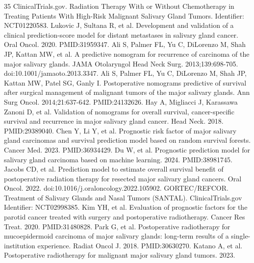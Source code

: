 \documentclass[10pt,twocolumn]{article}
\begin{document}
\begin{thebibliography}{35}
 ClinicalTrials.gov. Radiation Therapy With or Without Chemotherapy in Treating Patients With High-Risk Malignant Salivary Gland Tumors. Identifier: NCT01220583.
 Lukovic J, Sultana R, et al. Development and validation of a clinical prediction-score model for distant metastases in salivary gland cancer. Oral Oncol. 2020. PMID:31959347.
 Ali S, Palmer FL, Yu C, DiLorenzo M, Shah JP, Kattan MW, et al. A predictive nomogram for recurrence of carcinoma of the major salivary glands. JAMA Otolaryngol Head Neck Surg. 2013;139:698-705. doi:10.1001/jamaoto.2013.3347.
 Ali S, Palmer FL, Yu C, DiLorenzo M, Shah JP, Kattan MW, Patel SG, Ganly I. Postoperative nomograms predictive of survival after surgical management of malignant tumors of the major salivary glands. Ann Surg Oncol. 2014;21:637-642. PMID:24132626.
 Hay A, Migliacci J, Karassawa Zanoni D, et al. Validation of nomograms for overall survival, cancer-specific survival and recurrence in major salivary gland cancer. Head Neck. 2018. PMID:29389040.
 Chen Y, Li Y, et al. Prognostic risk factor of major salivary gland carcinomas and survival prediction model based on random survival forests. Cancer Med. 2023. PMID:36934429.
 Du W, et al. Prognostic prediction model for salivary gland carcinoma based on machine learning. 2024. PMID:38981745.
 Jacobs CD, et al. Prediction model to estimate overall survival benefit of postoperative radiation therapy for resected major salivary gland cancers. Oral Oncol. 2022. doi:10.1016/j.oraloncology.2022.105902.
 GORTEC/REFCOR. Treatment of Salivary Glands and Nasal Tumors (SANTAL). ClinicalTrials.gov Identifier: NCT02998385.
 Kim YH, et al. Evaluation of prognostic factors for the parotid cancer treated with surgery and postoperative radiotherapy. Cancer Res Treat. 2020. PMID:31480828.
 Park G, et al. Postoperative radiotherapy for mucoepidermoid carcinoma of major salivary glands: long-term results of a single-institution experience. Radiat Oncol J. 2018. PMID:30630270.
 Katano A, et al. Postoperative radiotherapy for malignant major salivary gland tumors. 2023.
\end{thebibliography}
\end{document}
